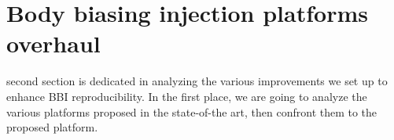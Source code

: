 
\section{Body biasing injection platforms overhaul}
 second section is dedicated in analyzing the various improvements we set up to enhance BBI reproducibility.
In the first place, we are going to analyze the various platforms proposed in the state-of-the art, then confront them to the proposed platform.
